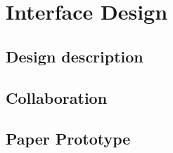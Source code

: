 \chapter{Interface Design}


\section{Design description}


\section{Collaboration}


\section{Paper Prototype}



